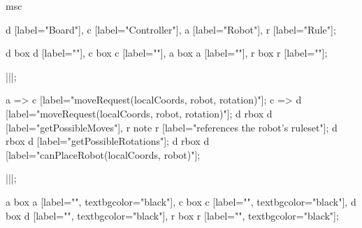 \begin{msc}
msc
{

d [label="Board"],
c [label="Controller"],
a [label="Robot"],
r [label="Rule"];

d box d [label=""],
c box c [label=""],
a box a [label=""],
r box r [label=""];

|||;

a => c [label="moveRequest(localCoords, robot, rotation)"];
c => d [label="moveRequest(localCoords, robot, rotation)"];
d rbox d [label="getPossibleMoves"], r note r [label="references the robot's ruleset"];
d rbox d [label="getPossibleRotations"];
d rbox d [label="canPlaceRobot(localCoords, robot)"];

|||;

a box a [label="", textbgcolor="black"],
c box c [label="", textbgcolor="black"],
d box d [label="", textbgcolor="black"],
r box r [label="", textbgcolor="black"];

}
\end{msc}
